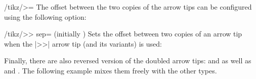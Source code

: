 \begin{key}{/tikz/>=}
  The offset between the two copies of the arrow tips can be
  configured using the following option:
  \begin{key}{/tikz/>> sep= (initially \string\pgflinewidth)}
    Sets the offset between two copies of an arrow tip when the |>>|
    arrow tip (and its variants) is used:
\begin{codeexample}[]
\begin{tikzpicture}[scale=2,ultra thick]
  \draw[>=latex,             < <->>] (0pt,3ex) -- (1cm,3ex);
  \draw[>=latex, >> sep=5pt, < <->>] (0pt,2ex) -- (1cm,2ex);
  \draw[>=latex, >> sep=0pt, < <->>] (0pt,1ex) -- (1cm,1ex);
\end{tikzpicture}
\end{codeexample}
  \end{key}

  Finally, there are also reversed version of the doubled arrow tips:
  \declareandlabel{>>} and \declareandlabel{<<} as well as
  \declareandlabel{> >} and \declareandlabel{< <}. The following
  example mixes them freely with the other types.
  
\begin{codeexample}[]
\begin{tikzpicture}[scale=2,ultra thick]
  \begin{scope}[>=latex]
    \draw[> >->>] (0pt,3ex) -- (1cm,3ex);
    \draw[|<-< <] (0pt,2ex) -- (1cm,2ex);
  \end{scope}
  \begin{scope}[>=stealth']
    \draw[< <->>] (0pt,1ex) -- (1cm,1ex);
    \draw[|<-> >] (0pt,0ex) -- (1cm,0ex);
  \end{scope}
\end{tikzpicture}
\end{codeexample}
\end{key}

